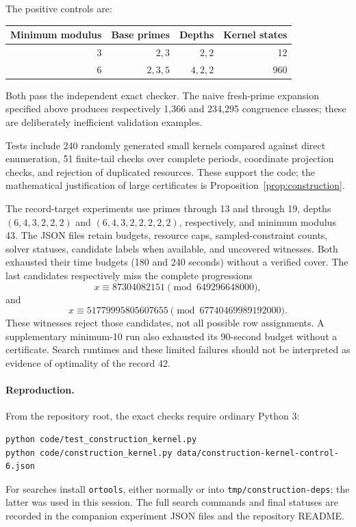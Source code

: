 \documentclass[11pt]{article}
\begin{document}
The positive controls are:
\begin{center}
\begin{tabular}{rrrr}
\toprule
Minimum modulus & Base primes & Depths & Kernel states\\
\midrule
3 & $2,3$ & $2,2$ & 12\\
6 & $2,3,5$ & $4,2,2$ & 960\\
\bottomrule
\end{tabular}
\end{center}
Both pass the independent exact checker. The naive fresh-prime expansion
specified above produces respectively 1,366 and 234,295 congruence classes;
these are deliberately inefficient validation examples.

Tests include 240 randomly generated small kernels compared against direct
enumeration, 51 finite-tail checks over complete periods, coordinate projection
checks, and rejection of duplicated resources. These support the code; the
mathematical justification of large certificates is Proposition~\ref{prop:construction}.

The record-target experiments use primes through 13 and through 19, depths
$(6,4,3,2,2,2)$ and $(6,4,3,2,2,2,2,2)$, respectively, and minimum modulus 43.
The JSON files retain budgets, resource caps, sampled-constraint counts,
solver statuses, candidate labels when available, and uncovered witnesses.
Both exhausted their time budgets (180 and 240 seconds) without a verified
cover. The last candidates respectively miss the complete progressions
\[
 x\equiv87304082151\pmod{649296648000},
\]
and
\[
 x\equiv51779995805607655\pmod{67740469989192000}.
\]
These witnesses reject those candidates, not all possible row assignments.
A supplementary minimum-10 run also exhausted its 90-second budget without
a certificate. Search runtimes and these limited failures should not be
interpreted as evidence of optimality of the record 42.

\paragraph{Reproduction.}
From the repository root, the exact checks require ordinary Python 3:
\begin{verbatim}
python code/test_construction_kernel.py
python code/construction_kernel.py data/construction-kernel-control-6.json
\end{verbatim}
For searches install \texttt{ortools}, either normally or into
\texttt{tmp/construction-deps}; the latter was used in this session.
The full search commands and final statuses are recorded in the companion
experiment JSON files and the repository README.
\end{document}
